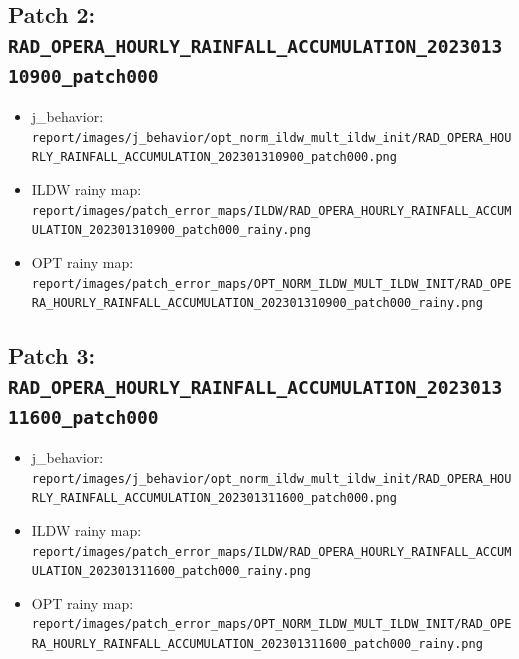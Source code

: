 \documentclass[11pt]{article}
\begin{document}
\subsection*{Patch 2: \texttt{RAD\_OPERA\_HOURLY\_RAINFALL\_ACCUMULATION\_202301310900\_patch000}}

\begin{itemize}[leftmargin=1.5em]
\item j\_behavior: \texttt{report/images/j\_behavior/opt\_norm\_ildw\_mult\_ildw\_init/RAD\_OPERA\_HOURLY\_RAINFALL\_ACCUMULATION\_202301310900\_patch000.png}
\item ILDW rainy map: \texttt{report/images/patch\_error\_maps/ILDW/RAD\_OPERA\_HOURLY\_RAINFALL\_ACCUMULATION\_202301310900\_patch000\_rainy.png}
\item OPT rainy map: \texttt{report/images/patch\_error\_maps/OPT\_NORM\_ILDW\_MULT\_ILDW\_INIT/RAD\_OPERA\_HOURLY\_RAINFALL\_ACCUMULATION\_202301310900\_patch000\_rainy.png}
\end{itemize}

\subsection*{Patch 3: \texttt{RAD\_OPERA\_HOURLY\_RAINFALL\_ACCUMULATION\_202301311600\_patch000}}

\begin{itemize}[leftmargin=1.5em]
\item j\_behavior: \texttt{report/images/j\_behavior/opt\_norm\_ildw\_mult\_ildw\_init/RAD\_OPERA\_HOURLY\_RAINFALL\_ACCUMULATION\_202301311600\_patch000.png}
\item ILDW rainy map: \texttt{report/images/patch\_error\_maps/ILDW/RAD\_OPERA\_HOURLY\_RAINFALL\_ACCUMULATION\_202301311600\_patch000\_rainy.png}
\item OPT rainy map: \texttt{report/images/patch\_error\_maps/OPT\_NORM\_ILDW\_MULT\_ILDW\_INIT/RAD\_OPERA\_HOURLY\_RAINFALL\_ACCUMULATION\_202301311600\_patch000\_rainy.png}
\end{itemize}
\end{document}
